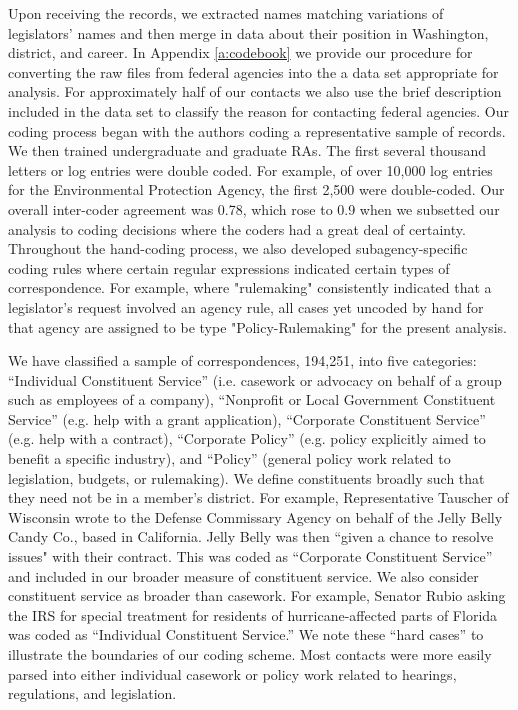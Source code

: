 \documentclass[12pt]{article}
\begin{document}
Upon receiving the records, we extracted names matching variations of legislators' names and then merge in data about their position in Washington, district, and career.  In Appendix \ref{a:codebook} we provide our procedure for converting the raw files from federal agencies into the a data set appropriate for analysis.  For approximately half of our contacts we also use the brief description included in the data set to classify the reason for contacting federal agencies.   Our coding process began with the authors coding a representative sample of records. We then trained undergraduate and graduate RAs. The first several thousand letters or log entries were double coded. For example, of over 10,000 log entries for the Environmental Protection Agency, the first 2,500 were double-coded.  Our overall inter-coder agreement was 0.78, which rose to 0.9 when we subsetted our analysis to coding decisions where the coders had a great deal of certainty.  Throughout the hand-coding process, we also developed subagency-specific coding rules where certain regular expressions indicated certain types of correspondence. For example, where "rulemaking" consistently indicated that a legislator's request involved an agency rule, all cases yet uncoded by hand for that agency are assigned to be type "Policy-Rulemaking" for the present analysis.    

We have classified a sample of correspondences, 194,251, into five categories: ``Individual Constituent Service'' (i.e. casework or advocacy on behalf of a group such as employees of a company), ``Nonprofit or Local Government Constituent Service'' (e.g. help with a grant application), ``Corporate Constituent Service'' (e.g. help with a contract), ``Corporate Policy'' (e.g. policy explicitly aimed to benefit a specific industry), and ``Policy'' (general policy work related to legislation, budgets, or rulemaking).  We define constituents broadly such that they need not be in a member's district. For example, Representative Tauscher of Wisconsin wrote to the Defense Commissary Agency on behalf of the Jelly Belly Candy Co., based in California. Jelly Belly was then ``given a chance to resolve issues" with their contract. This was coded as ``Corporate Constituent Service'' and included in our broader measure of constituent service.  We also consider constituent service as broader than casework. For example, Senator Rubio asking the IRS for special treatment for residents of hurricane-affected parts of Florida was coded as ``Individual Constituent Service.'' We note these ``hard cases'' to illustrate the boundaries of our coding scheme. Most contacts were more easily parsed into either individual casework or policy work related to hearings, regulations, and legislation.
\end{document}
